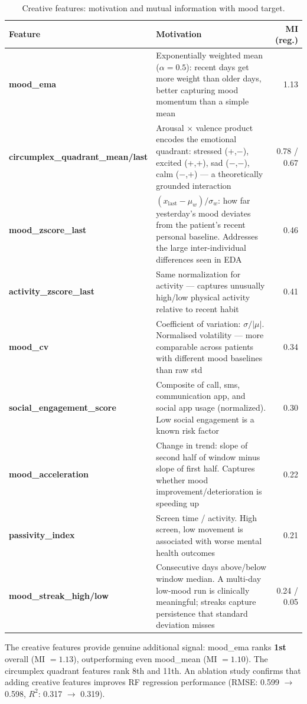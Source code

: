 \documentclass[runningheads]{llncs}
\begin{document}
\begin{table}[H]
\centering
\caption{Creative features: motivation and mutual information with mood target.}\label{tab:creative}
\begin{tabular}{lp{5.2cm}r}
\toprule
Feature & Motivation & MI (reg.) \\
\midrule
\textbf{mood\_ema} & Exponentially weighted mean ($\alpha=0.5$): recent days get more weight than older days, better capturing mood momentum than a simple mean & 1.13 \\
\textbf{circumplex\_quadrant\_mean/last} & Arousal $\times$ valence product encodes the emotional quadrant: stressed (+,$-$), excited (+,+), sad ($-$,$-$), calm ($-$,+) — a theoretically grounded interaction~\cite{russell1980} & 0.78 / 0.67 \\
\textbf{mood\_zscore\_last} & $(x_{\text{last}} - \mu_w) / \sigma_w$: how far yesterday's mood deviates from the patient's recent personal baseline. Addresses the large inter-individual differences seen in EDA & 0.46 \\
\textbf{activity\_zscore\_last} & Same normalization for activity — captures unusually high/low physical activity relative to recent habit & 0.41 \\
\textbf{mood\_cv} & Coefficient of variation: $\sigma / |\mu|$. Normalised volatility — more comparable across patients with different mood baselines than raw std & 0.34 \\
\textbf{social\_engagement\_score} & Composite of call, sms, communication app, and social app usage (normalized). Low social engagement is a known risk factor~\cite{de2012} & 0.30 \\
\textbf{mood\_acceleration} & Change in trend: slope of second half of window minus slope of first half. Captures whether mood improvement/deterioration is speeding up & 0.22 \\
\textbf{passivity\_index} & Screen time / activity. High screen, low movement is associated with worse mental health outcomes~\cite{twenge2018} & 0.21 \\
\textbf{mood\_streak\_high/low} & Consecutive days above/below window median. A multi-day low-mood run is clinically meaningful; streaks capture persistence that standard deviation misses & 0.24 / 0.05 \\
\bottomrule
\end{tabular}
\end{table}

The creative features provide genuine additional signal: mood\_ema ranks \textbf{1st} overall (MI $= 1.13$), outperforming even mood\_mean (MI $= 1.10$). The circumplex quadrant features rank 8th and 11th. An ablation study confirms that adding creative features improves RF regression performance (RMSE: 0.599 $\to$ 0.598, $R^2$: 0.317 $\to$ 0.319).
\end{document}
